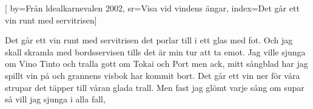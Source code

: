 

[ 			%
	by={Från ldealkarnevalen 2002},			%
	sr={Visa vid vindens ängar},				%
	index={Det går ett vin runt med servitrisen}]						%
	
\beginverse*

Det går ett vin runt med servitrisen
det porlar till i ett glas med fot.
Och jag skall skramla med bordsservisen
tills det är min tur att ta emot.
Jag ville sjunga om Vino Tinto
och tralla gott om Tokai och Port
men ack, mitt sångblad har jag spillt vin på
och grannens visbok har kommit bort.
Det går ett vin ner för våra strupar
det täpper till våran glada trall.
Men fast jag glömt varje sång om supar
så vill jag sjunga i alla fall,
\endverse

\endsong							%